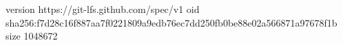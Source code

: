 version https://git-lfs.github.com/spec/v1
oid sha256:f7d28c16f887aa7f0221809a9edb76ec7dd250fb0be88e02a566871a97678f1b
size 1048672
